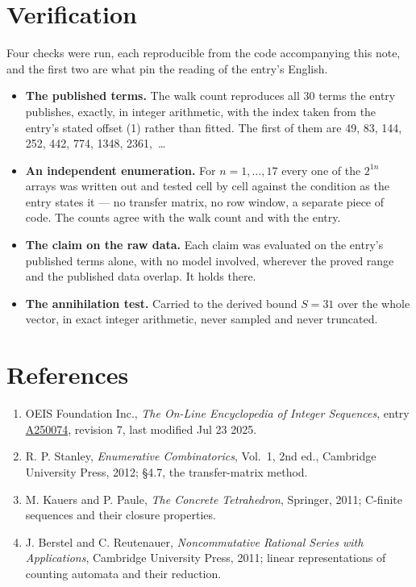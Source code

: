 \documentclass[11pt]{article}
\theoremstyle{definition}
\begin{document}
\section{Verification}

Four checks were run, each reproducible from the code accompanying this note, and the first two are what pin the reading of the entry's English.

\begin{itemize}

\item {\bfseries The published terms.} The walk count reproduces all 30 terms the entry publishes, exactly, in integer arithmetic, with the index taken from the entry's stated offset (1) rather than fitted. The first of them are 49, 83, 144, 252, 442, 774, 1348, 2361,~\dots

\item {\bfseries An independent enumeration.} For $n = 1,\dots,17$ every one of the $2^{1n}$ arrays was written out and tested cell by cell against the condition as the entry states it --- no transfer matrix, no row window, a separate piece of code. The counts agree with the walk count and with the entry.

\item {\bfseries The claim on the raw data.} Each claim was evaluated on the entry's published terms alone, with no model involved, wherever the proved range and the published data overlap. It holds there.

\item {\bfseries The annihilation test.} Carried to the derived bound $S = 31$ over the whole vector, in exact integer arithmetic, never sampled and never truncated.

\end{itemize}

\section{References}

\begin{enumerate}

\item OEIS Foundation Inc., \emph{The On-Line Encyclopedia of Integer Sequences}, entry \href{https://oeis.org/A250074}{A250074}, revision 7, last modified Jul 23 2025.

\item R. P. Stanley, \emph{Enumerative Combinatorics}, Vol.~1, 2nd ed., Cambridge University Press, 2012; \S4.7, the transfer-matrix method.

\item M. Kauers and P. Paule, \emph{The Concrete Tetrahedron}, Springer, 2011; C-finite sequences and their closure properties.

\item J. Berstel and C. Reutenauer, \emph{Noncommutative Rational Series with Applications}, Cambridge University Press, 2011; linear representations of counting automata and their reduction.

\end{enumerate}
\end{document}
